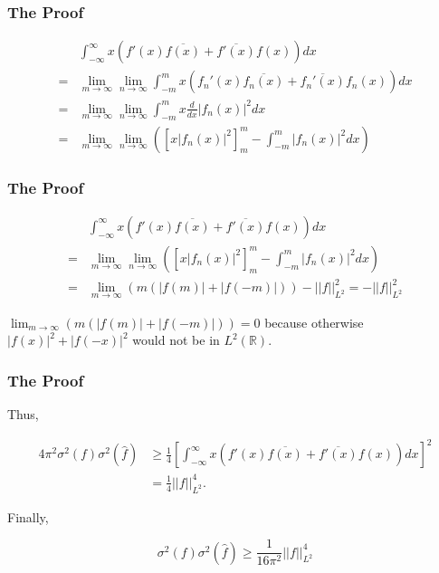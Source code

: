 \documentclass{beamer}
\newcommand{\h}[1]{\hat{#1}}
\newcommand{\R}{\mathbb{R}}
\newcommand{\aabs}[1]{\left\lvert\left\lvert #1\right\rvert\right\rvert}
\newcommand{\abs}[1]{\left\lvert #1\right\rvert}
\begin{document}
\begin{frame}
    \frametitle{The Proof}

    \begin{align*}
        &\int_{-\infty}^{\infty} x(f'(x)\overline{f(x)} + \overline{f'(x)}f(x))dx \\=& \lim_{m \to \infty} \lim_{n \to \infty} \int_{-m}^{m} x(f_n'(x)\overline{f_n(x)} + \overline{f_n'(x)}f_n(x))dx \\
        =& \lim_{m \to \infty} \lim_{n \to \infty} \int_{-m}^{m} x \frac{d}{dx}\abs{f_n(x)}^2 dx\\
        =& \lim_{m \to \infty} \lim_{n \to \infty} 
        \left([x\abs{f_n(x)}^2]^{m}_m - \int_{-m}^{m}\abs{f_n(x)}^2 dx \right)
    \end{align*} 

\end{frame}

\begin{frame}
    \frametitle{The Proof}

    \begin{align*}
        &\int_{-\infty}^{\infty} x(f'(x)\overline{f(x)} + \overline{f'(x)}f(x))dx \\=& \lim_{m \to \infty} \lim_{n \to \infty} 
        \left([x\abs{f_n(x)}^2]^{m}_m - \int_{-m}^{m}\abs{f_n(x)}^2 dx \right) \\
        =&  \lim_{m \to \infty}(m(\abs{f(m)} + \abs{f(-m)})) - \aabs{f}_{L^2}^2 = - \aabs{f}_{L^2}^2
    \end{align*}

    $\lim_{m \to \infty}(m(\abs{f(m)}+ \abs{f(-m)})) = 0$ because otherwise $\abs{f(x)}^2 + \abs{f(-x)}^2$ would not be in $L^2(\R)$.   

\end{frame}

\begin{frame}
    \frametitle{The Proof}

    Thus, 

    \begin{align*}
        4 \pi^2 \sigma^2(f) \sigma^2(\h{f}) &\geq \frac{1}{4} \left[\int_{-\infty}^{\infty} x(f'(x)\overline{f(x)} + \overline{f'(x)}f(x))dx\right]^2 \\
        &= \frac{1}{4} \aabs{f}_{L^2}^4. 
    \end{align*}

    Finally, 

    \[
        \sigma^2(f) \sigma^2(\h{f}) \geq \frac{1}{16 \pi^2} \aabs{f}_{L^2}^4
    \]

\end{frame}
\end{document}

